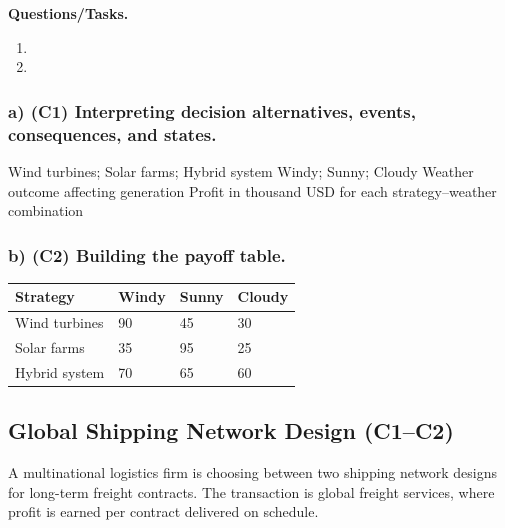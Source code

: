 	\textbf{Questions/Tasks.}
	\begin{enumerate}[label=\textbf{\alph*)}]
		\item {}
		\item {}
	\end{enumerate}
	
	\subsubsection*{a) \textbf{(C1)} Interpreting decision alternatives, events, consequences, and states.}
	\label{subsec:problem2-green-energy-production-mix-c1}
	\DecisionElementsTable
	{Wind turbines; Solar farms; Hybrid system}
	{Windy; Sunny; Cloudy}
	{Weather outcome affecting generation}
	{Profit in thousand USD for each strategy--weather combination}
	
	
	\subsubsection*{b) \textbf{(C2)} Building the payoff table.}
	\label{subsec:problem2-green-energy-production-mix-c2}
	\begin{center}
		\begin{tabular}{llll}
			\toprule
			Strategy & Windy & Sunny & Cloudy \\
			\midrule
			Wind turbines & 90 & 45 & 30 \\
			Solar farms & 35 & 95 & 25 \\
			Hybrid system & 70 & 65 & 60 \\
			\bottomrule
		\end{tabular}
	\end{center}
	
	
	\subsection{Global Shipping Network Design (C1--C2)}
	\label{sec:problem3-global-shipping-network-design-c1-c2}
	A multinational logistics firm is choosing between two shipping network designs for long-term freight contracts. The transaction is global freight services, where profit is earned per contract delivered on schedule.
	
